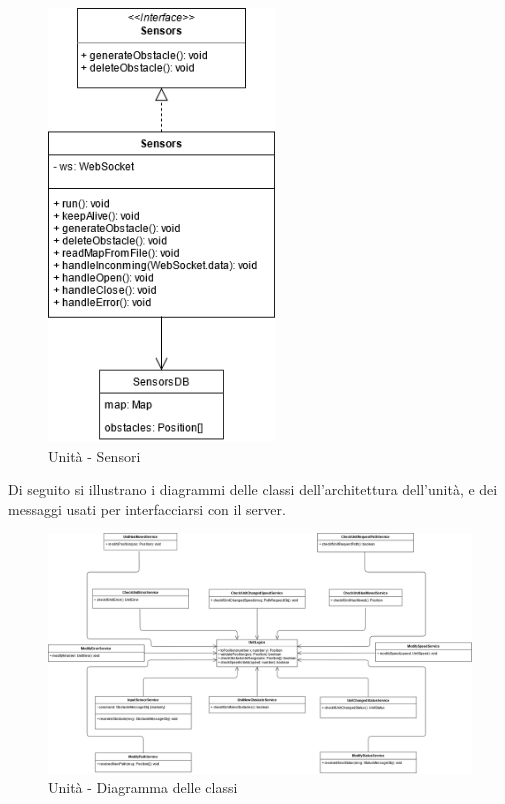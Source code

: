	\begin{figure}[H]
		\centering
		\includegraphics[width=6cm]{img/unit_sensori.png}
		\caption{Unità - Sensori}
	\end{figure}
	
	Di seguito si illustrano i diagrammi delle classi dell'architettura dell'unità, e dei messaggi usati per interfacciarsi con il server.
	
	\begin{landscape}
		\begin{figure}[h!]
			\includegraphics[width=25.5cm]{img/unit_architettura1.png}
			\caption{Unità - Diagramma delle classi}
		\end{figure}
	\end{landscape}
	
